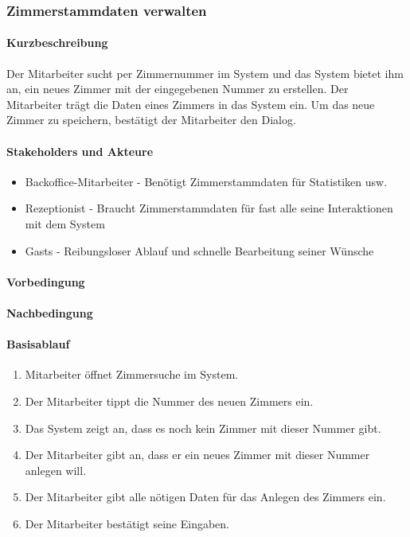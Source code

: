 \subsubsection{Zimmerstammdaten verwalten}

\paragraph{Kurzbeschreibung}
Der \Gls{Mitarbeiter} sucht per \Gls{Zimmernummer} im System und das System
bietet ihm an, ein neues \Gls{Zimmer} mit der eingegebenen Nummer zu erstellen.
Der \Gls{Mitarbeiter} trägt die Daten eines \Gls{Zimmer}s in das System ein. Um
das neue \Gls{Zimmer} zu speichern, bestätigt der \Gls{Mitarbeiter} den Dialog.

\paragraph{Stakeholders und Akteure}
\begin{itemize}
	\item \Gls{Backoffice}-\Gls{Mitarbeiter} - Benötigt Zimmerstammdaten für Statistiken usw.
	\item \Gls{Rezeptionist} - Braucht Zimmerstammdaten für fast alle seine Interaktionen mit dem System
	\item \Glspl{Gast} - Reibungsloser Ablauf und schnelle Bearbeitung seiner Wünsche
\end{itemize}

\paragraph{Vorbedingung}


\paragraph{Nachbedingung}

\paragraph{Basisablauf}
\begin{enumerate}
	\item \Gls{Mitarbeiter} öffnet Zimmersuche im System.
	\item Der \Gls{Mitarbeiter} tippt die Nummer des neuen \Gls{Zimmer}s ein.
	\item Das System zeigt an, dass es noch kein \Gls{Zimmer} mit dieser Nummer gibt.
	\item Der \Gls{Mitarbeiter} gibt an, dass er ein neues \Gls{Zimmer} mit dieser Nummer anlegen will.
	\item Der \Gls{Mitarbeiter} gibt alle nötigen Daten für das Anlegen des \Gls{Zimmer}s ein.
	\item Der \Gls{Mitarbeiter} bestätigt seine Eingaben.
\end{enumerate}

